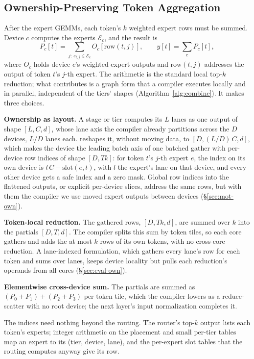 \subsection{Ownership-Preserving Token Aggregation}
\label{sec:red}

After the expert GEMMs, each token's $k$ weighted expert rows must be summed. Device $c$ computes the experts
$\mathcal{E}_c$, and the result is
\begin{equation}
P_c[t]=\sum_{j:\,e_{t,j}\in\mathcal{E}_c} O_c[\mathrm{row}(t,j)],\qquad y[t]=\sum_c P_c[t],
\label{eq:agg}
\end{equation}
where $O_c$ holds device $c$'s weighted expert outputs and $\mathrm{row}(t,j)$ addresses the output of token $t$'s $j$-th
expert. The arithmetic is the standard local top-$k$ reduction; what \sys contributes is a graph form that a compiler executes
locally and in parallel, independent of the tiers' shapes (Algorithm~\ref{alg:combine}). It makes three choices.

\textbf{Ownership as layout.} A stage or tier computes its $L$ lanes as one output of shape $[L,C,d]$, whose lane axis the
compiler already partitions across the $D$ devices, $L/D$ lanes each. \sys reshapes it, without moving data, to
$[D,(L/D)\,C,d]$, which makes the device the leading batch axis of one batched gather with per-device row indices of shape
$[D,Tk]$: for token $t$'s $j$-th expert $e$, the index on its own device is $l\,C+\mathrm{slot}(e,t)$, with $l$ the expert's
lane on that device, and every other device gets a safe index and a zero mask. Global row indices into the flattened
outputs, or explicit per-device slices, address the same rows, but with them the compiler we use moved expert outputs
between devices (\S\ref{sec:mot-own}).

\textbf{Token-local reduction.} The gathered rows, $[D,Tk,d]$, are summed over $k$ into the partials $[D,T,d]$. The
compiler splits this sum by token tiles, so each core gathers and adds the at most $k$ rows of its own tokens, with no
cross-core reduction. A lane-indexed formulation, which gathers every lane's row for each token and sums over lanes, keeps
device locality but pulls each reduction's operands from all cores (\S\ref{sec:eval-own}).

\textbf{Elementwise cross-device sum.} The partials are summed as $(P_0+P_1)+(P_2+P_3)$ per token tile, which the compiler
lowers as a reduce-scatter with no root device; the next layer's input normalization completes it.

The indices need nothing beyond the routing. The router's top-$k$ output lists each token's experts; integer arithmetic on
the placement and small per-tier tables map an expert to its (tier, device, lane), and the per-expert slot tables that
the routing computes anyway give its row.

